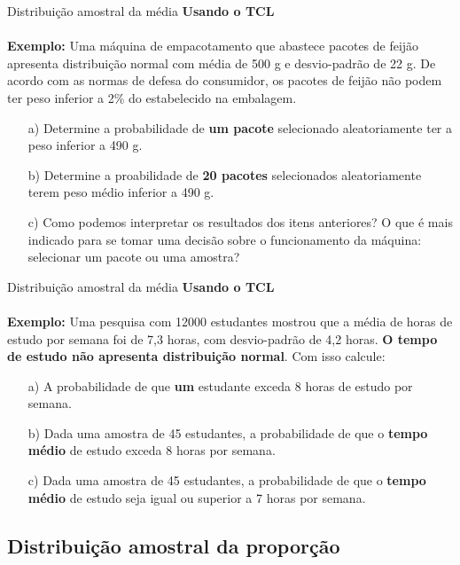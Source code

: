 \documentclass[10pt]{beamer}\usepackage[]{graphicx}\usepackage[]{color}
\theoremstyle{definition}
\begin{document}
\begin{frame}{Distribuição amostral da média}
  \textbf{Usando o TCL} \\~\\

  \textbf{Exemplo:} Uma máquina de empacotamento que abastece pacotes de
  feijão apresenta distribuição normal com média de 500 g e
  desvio-padrão de 22 g. De acordo com as normas de defesa do
  consumidor, os pacotes de feijão não podem ter peso inferior a 2\% do
  estabelecido na embalagem.
  \begin{itemize}
  \item[a)] Determine a probabilidade de \textbf{um pacote} selecionado
    aleatoriamente ter a peso inferior a 490 g.
  \item[b)] Determine a proabilidade de \textbf{20 pacotes} selecionados
    aleatoriamente terem peso médio inferior a 490 g.
  \item[c)] Como podemos interpretar os resultados dos itens anteriores?
    O que é mais indicado para se tomar uma decisão sobre o
    funcionamento da máquina: selecionar um pacote ou uma amostra?
  \end{itemize}
\end{frame}

\begin{frame}{Distribuição amostral da média}
  \textbf{Usando o TCL} \\~\\

  \textbf{Exemplo:} Uma pesquisa com 12000 estudantes mostrou que a
  média de horas de estudo por semana foi de 7,3 horas, com
  desvio-padrão de 4,2 horas. \textbf{O tempo de estudo não apresenta
    distribuição normal}. Com isso calcule:
  \begin{itemize}
  \item[a)] A probabilidade de que \textbf{um} estudante exceda 8 horas de
    estudo por semana.
  \item[b)] Dada uma amostra de 45 estudantes, a probabilidade de que o
    \textbf{tempo médio} de estudo exceda 8 horas por semana.
  \item[c)] Dada uma amostra de 45 estudantes, a probabilidade de que o
    \textbf{tempo médio} de estudo seja igual ou superior a 7 horas por
    semana.
  \end{itemize}
\end{frame}

\subsection{Distribuição amostral da proporção}
\end{document}
